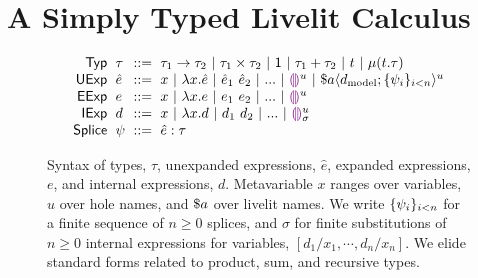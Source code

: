 \section{A Simply Typed Livelit Calculus}\label{sec:livelit-calculus}

\begin{figure}
    \[
    \arraycolsep=3pt\begin{array}{rlcl}
        \mathsf{Typ} & \tau & ::= &
                                    \tarr{\tau_1}{\tau_2} ~\vert~
                                    \tprod{\tau_1}{\tau_2} ~\vert~
                                    \tunit ~\vert~
                                    \tsum{\tau_1}{\tau_2} ~\vert~
                                    t ~\vert~
                                    \trec{t}{\tau}\\
        \mathsf{UExp} & \hat{e} & ::= & 
                                 x ~\vert~
                                 \hlam{x}{\hat e} ~\vert~
                                 \hap{\hat e_1}{\hat e_2} ~\vert~
                                 ... ~\vert~
                                 \hehole{u} ~\vert~
                                 \haplivelit{u}{a}{\dtxt{model}}{\splices}\\
        \mathsf{EExp} & e & ::= & x ~\vert~ \hlam{x}{e} ~\vert~ \hap{e_1}{e_2} ~\vert~ ... ~\vert~ \hehole{u}\\
        \mathsf{IExp} & d & ::= & x ~\vert~ \hlam{x}{d} ~\vert~ \hap{d_1}{d_2} ~\vert~ ... ~\vert~ \dehole{u}{\sigma}\\
        \mathsf{Splice} & \psi & ::= & \hsplice{\hat e}{\tau}
    \end{array}
    \]
    \caption{Syntax of types, $\tau$, unexpanded expressions, $\hat{e}$, expanded expressions, $e$, and internal expressions, $d$.
    Metavariable $x$ ranges over variables, $u$ over hole names, and $\$a$ over livelit names.
    We write $\{\psi_i\}_{i < n}$ for a finite sequence of $n \geq 0$ splices,
    and $\sigma$ for finite substitutions of $n \geq 0$ internal expressions for variables, $[d_1/x_1, \cdots, d_n/x_n]$.
    We elide standard forms
    related to product, sum, and recursive types.
    }
    \label{fig:syntax}
    \end{figure}

